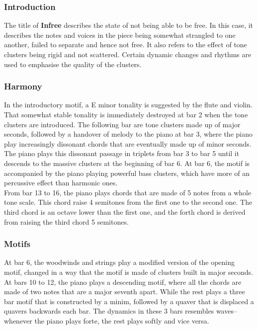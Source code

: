 \documentclass{article}
\begin{document}
\subsubsection{Introduction}

The title of \textbf{Infree} describes the state of not being able to be free.
In this case, it describes the notes and voices in the piece being somewhat
strangled to one another, failed to separate and hence not free.
It also refers to the effect of tone clusters being rigid and not
scattered. Certain dynamic changes and rhythms are used to emphasise
the quality of the clusters.

\subsubsection{Harmony}

In the introductory motif,
a E minor tonality is suggested by the flute and violin.
That somewhat stable tonality is immediately destroyed at bar 2
when the tone clusters are introduced.
The following bar are tone clusters made up of major seconds,
followed by a handover of melody to the piano at bar 3,
where the piano play increasingly dissonant chords that are
eventually made up of minor seconds.\\

The piano plays this dissonant passage in triplets from bar 3 to bar 5
until it descends to the massive clusters at the beginning of bar 6.
At bar 6, the motif is accompanied by the piano playing powerful bass clusters,
which have more of an percussive effect than harmonic ones.\\

From bar 13 to 16, the piano plays chords that are made of 5 notes from
a whole tone scale. This chord raise 4 semitones from the first one
to the second one. The third chord is an octave lower than the first one,
and the forth chord is derived from raising the third chord 5 semitones.

\subsubsection{Motifs}


At bar 6, the woodwinds and strings play a modified version
of the opening motif, changed in a way that the motif
is made of clusters built in major seconds.
At bars 10 to 12, the piano plays a descending motif,
where all the chords are made of two notes that are a major seventh apart.
While the rest plays a three bar motif that is constructed by a minim,
followed by a quaver that is displaced a quavers backwards each bar.
The dynamics in these 3 bars resembles waves--whenever the piano plays forte,
the rest plays softly and vice versa.\\
\end{document}
